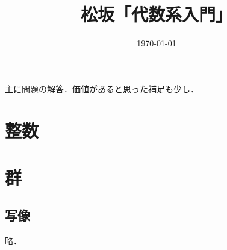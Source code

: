 \documentclass[a4paper,10pt,uplatex]{jsarticle}
\numberwithin{equation}{section}
\theoremstyle{mystyle}
\begin{document}
\title{松坂「代数系入門」}
\author{}
\date{\today}
\maketitle

主に問題の解答．価値があると思った補足も少し．

\section{整数}
\section{群}
\subsection{写像}
略．
\end{document}
